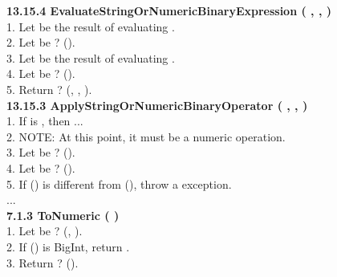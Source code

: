 \noindent
\textbf{13.15.4 EvaluateStringOrNumericBinaryExpression (
  ,
  ,
)}
\vspace*{.5em}\\%
1. Let  be the result of evaluating .
\\%
2. Let  be ? ().
\\%
3. Let  be the result of evaluating .
\\%
4. Let  be ? ().
\\%
5. Return ? (,
, ).
\\%

\noindent
\textbf{13.15.3 ApplyStringOrNumericBinaryOperator (
  ,
  ,
)}
\vspace*{.5em}\\%
1. If  is \escode{+}, then ...
\\%
2. NOTE: At this point, it must be a numeric operation.
\\%
3. Let  be ? ().
\\%
4. Let  be ? ().
\\%
5. If () is different from (),
throw a  exception.
\\%
...
\\%

\noindent
\textbf{7.1.3 ToNumeric (  )}
\vspace*{.5em}\\%
1. Let  be ? (,
).
\\%
2. If () is BigInt, return .
\\%
3. Return ? ().
\\%

